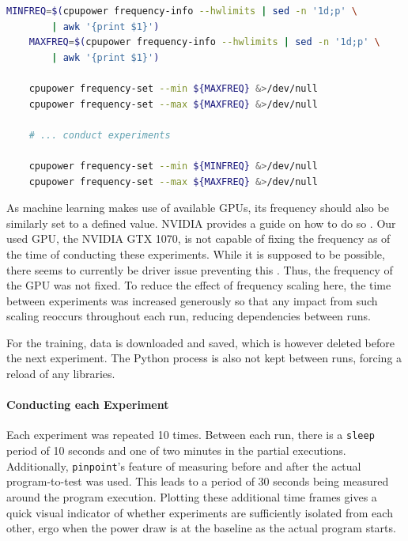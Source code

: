\begin{minipage}{\linewidth}
\begin{lstlisting}[language=bash, frame=single, numbers=none, caption={Used operating system information}, basicstyle=\ttfamily]
    MINFREQ=$(cpupower frequency-info --hwlimits | sed -n '1d;p' \
        | awk '{print $1}')
    MAXFREQ=$(cpupower frequency-info --hwlimits | sed -n '1d;p' \
        | awk '{print $1}')
    
    cpupower frequency-set --min ${MAXFREQ} &>/dev/null
    cpupower frequency-set --max ${MAXFREQ} &>/dev/null

    # ... conduct experiments

    cpupower frequency-set --min ${MINFREQ} &>/dev/null
    cpupower frequency-set --max ${MAXFREQ} &>/dev/null
\end{lstlisting}
\label{listing:setting_cpu_frequency}
\end{minipage}

As machine learning makes use of available GPUs, its frequency should also be similarly set to a defined value. 
NVIDIA provides a guide on how to do so .
Our used GPU, the NVIDIA GTX 1070, is not capable of fixing the frequency as of the time of conducting these experiments. 
While it is supposed to be possible, there seems to currently be driver issue preventing this .
Thus, the frequency of the GPU was not fixed. 
To reduce the effect of frequency scaling here, the time between experiments was increased generously so that any impact from such scaling reoccurs throughout each run, reducing dependencies between runs.

For the training, data is downloaded and saved, which is however deleted before the next experiment. 
The Python process is also not kept between runs, forcing a reload of any libraries.

\paragraph{Conducting each Experiment}

Each experiment was repeated 10 times. 
Between each run, there is a \verb|sleep| period of 10 seconds and one of two minutes in the partial executions. 
Additionally, \verb|pinpoint|'s feature of measuring before and after the actual program-to-test was used. 
This leads to a period of 30 seconds being measured around the program execution. 
Plotting these additional time frames gives a quick visual indicator of whether experiments are sufficiently isolated from each other, ergo when the power draw is at the baseline as the actual program starts.

